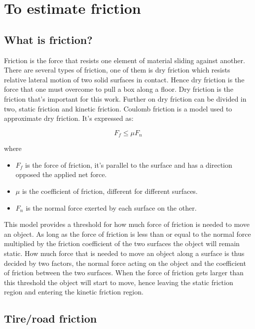 \chapter{To estimate friction}

\section{What is friction?}
Friction is the force that resists one element of material sliding against another. There are several types of friction, one of them is dry friction which resists relative lateral motion of two solid surfaces in contact. Hence dry friction is the force that one must overcome to pull a box along a floor. Dry friction is the friction that's important for this work. Further on dry friction can be divided in two, static friction and kinetic friction. Coulomb friction is a model used to approximate dry friction. It's expressed as:

\begin{equation}
F_{f}\leq\mu F_{n}
\end{equation}

where

\begin{itemize}
	\item $ F_{f} $ is the force of friction, it's parallel to the surface and has a direction opposed the applied net force.
	\item $ \mu $ is the coefficient of friction, different for different surfaces.
	\item $ F_{n} $ is the normal force exerted by each surface on the other.
\end{itemize}

This model provides a threshold for how much force of friction is needed to move an object. As long as the force of friction is less than or equal to the normal force multiplied by the friction coefficient of the two surfaces the object will remain static. How much force that is needed to move an object along a surface is thus decided by two factors, the normal force acting on the object and the coefficient of friction between the two surfaces. When the force of friction gets larger than this threshold the object will start to move, hence leaving the static friction region and entering the kinetic friction region. 

\section{Tire/road friction}

